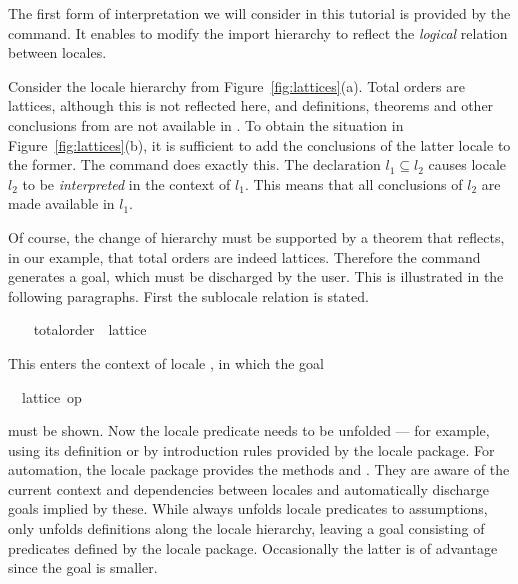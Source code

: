 \begin{isabellebody}
\begin{isamarkuptext}
  The first form of interpretation we will consider in this tutorial
  is provided by the  command.  It enables to
  modify the import hierarchy to reflect the \emph{logical} relation
  between locales.

  Consider the locale hierarchy from Figure~\ref{fig:lattices}(a).
  Total orders are lattices, although this is not reflected here, and
  definitions, theorems and other conclusions
  from  are not available in .  To
  obtain the situation in Figure~\ref{fig:lattices}(b), it is
  sufficient to add the conclusions of the latter locale to the former.
  The  command does exactly this.
  The declaration  $l_1
  \subseteq l_2$ causes locale $l_2$ to be \emph{interpreted} in the
  context of $l_1$.  This means that all conclusions of $l_2$ are made
  available in $l_1$.

  Of course, the change of hierarchy must be supported by a theorem
  that reflects, in our example, that total orders are indeed
  lattices.  Therefore the  command generates a
  goal, which must be discharged by the user.  This is illustrated in
  the following paragraphs.  First the sublocale relation is stated.%
\end{isamarkuptext}%
\isamarkuptrue%
%
\isadelimvisible
\ \ %
\endisadelimvisible
%
\isatagvisible
{}\isamarkupfalse%
\ total{}order\ {}\ lattice%
\begin{isamarkuptxt}%
\normalsize
  This enters the context of locale , in
  which the goal \begin{isabelle}%
\ {}{}\ lattice\ op\ {}%
\end{isabelle} must be shown.
  Now the
  locale predicate needs to be unfolded --- for example, using its
  definition or by introduction rules
  provided by the locale package.  For automation, the locale package
  provides the methods  and .  They are aware of the
  current context and dependencies between locales and automatically
  discharge goals implied by these.  While 
  always unfolds locale predicates to assumptions,  only unfolds definitions along the locale
  hierarchy, leaving a goal consisting of predicates defined by the
  locale package.  Occasionally the latter is of advantage since the goal
  is smaller.


\end{isamarkuptxt}
\end{isabellebody}
